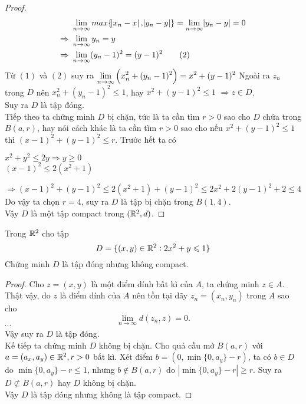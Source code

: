 \begin{proof}
\begin{align*}
        &\ \lim_{n\to\infty}max\{\abs{x_n - x},\abs{y_n - y}\} =\lim_{n\to\infty} \abs{y_n - y} = 0\\
        \Rightarrow&\ \lim_{n\to\infty} y_n = y\\
        \Rightarrow&\ \lim_{n\to\infty} (y_n-1)^2 = (y-1)^2 \tag{2}
    \end{align*}
    Từ $(1)$ và $(2)$ suy ra $\displaystyle\lim_{n\to\infty} \left(x_n^2 + (y_n-1)^2\right) = x^2 +(y-1)^2$\nl
    Ngoài ra $z_n$ trong $D$ nên $x_n^2 + (y_n-1)^2 \leq 1$, hay $x^2 +(y-1)^2 \leq 1$\nl
    $\Rightarrow z \in D$.\\
    Suy ra $D$ là tập đóng.\\[3mm]
    Tiếp theo ta chứng minh $D$ bị chặn, tức là ta cần tìm $r > 0$ sao cho $D$ chứa trong $B(a,r)$, hay nói cách khác là ta cần tìm $r>0$ sao cho nếu $x^2 + (y-1)^2 \leq 1$ thì $(x-1)^2 + (y-1)^2 \leq r$. Trước hết ta có
    \begin{center}
        $x^2 + y^2 \leq 2y \Rightarrow y \geq 0$\\
        $(x-1)^2 \leq 2(x^2+1)$
    \end{center}
    $\Rightarrow (x-1)^2 + (y-1)^2 \leq 2(x^2+1) + (y-1)^2 \leq 2x^2 + 2(y-1)^2 +2 \leq 4$\\
    Do vậy ta chọn $r=4$, suy ra $D$ là tập bị chặn trong $B(1,4)$.\\
    Vậy $D$ là một tập compact trong $(\mathbb R^2,d)$.
\end{proof}

\begin{exercise}{23} Trong $\mathbb R^2$ cho tập
    $$
        D = \{(x,y) \in \mathbb R^2 : 2x^2 + y \leqslant 1\}
    $$
    Chứng minh $D$ là tập đóng nhưng không compact.
\end{exercise}

\begin{proof}
Cho $z = (x,y)$ là một điểm dính bất kì của $A$, ta chứng minh $z \in A$. Thật vậy, do $z$ là điểm dính của $A$ nên tồn tại dãy $z_n = (x_n, y_n)$ trong $A$ sao cho
$$
    \lim_{n \to \infty} d(z_n,z) = 0.
$$
$\cdots$\\
Vậy suy ra $D$ là tập đóng.\\[3mm]
Kế tiếp ta chứng minh $D$ không bị chặn. Cho quả cầu mở $B(a,r)$ với $a = (a_x, a_y) \in \mathbb R^2, r > 0$ bất kì. Xét điểm $b = (0, \min\{0, a_y\}-r)$, ta có $b \in D$ do $\min\{0, a_y\} - r \leq 1$, nhưng $b \notin B(a,r)$ do $|\min\{0, a_y\} - r| \geq r$. Suy ra $D \not\subset B(a,r)$ hay $D$ không bị chặn.\\
Vậy $D$ là tập đóng nhưng không là tập compact.
\end{proof}


